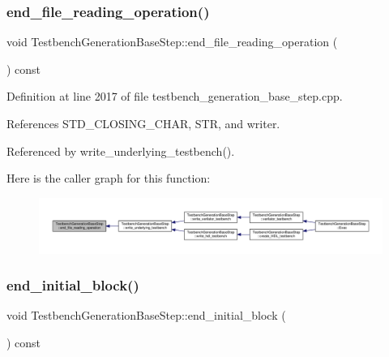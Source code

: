 \subsubsection{\texorpdfstring{end\+\_\+file\+\_\+reading\+\_\+operation()}{end\_file\_reading\_operation()}}
{\footnotesize\ttfamily void Testbench\+Generation\+Base\+Step\+::end\+\_\+file\+\_\+reading\+\_\+operation (\begin{DoxyParamCaption}{ }\end{DoxyParamCaption}) const\hspace{0.3cm}{\ttfamily [protected]}}



Definition at line 2017 of file testbench\+\_\+generation\+\_\+base\+\_\+step.\+cpp.



References S\+T\+D\+\_\+\+C\+L\+O\+S\+I\+N\+G\+\_\+\+C\+H\+AR, S\+TR, and writer.



Referenced by write\+\_\+underlying\+\_\+testbench().

Here is the caller graph for this function\+:
\nopagebreak
\begin{figure}[H]
\begin{center}
\leavevmode
\includegraphics[width=350pt]{dc/d02/classTestbenchGenerationBaseStep_ae3c011333a26f77252e27244cd7f08a9_icgraph}
\end{center}
\end{figure}
\mbox{\label{classTestbenchGenerationBaseStep_a3e753eed3a77b2340fb97e257f2ba820}} 
\subsubsection{\texorpdfstring{end\+\_\+initial\+\_\+block()}{end\_initial\_block()}}
{\footnotesize\ttfamily void Testbench\+Generation\+Base\+Step\+::end\+\_\+initial\+\_\+block (\begin{DoxyParamCaption}{ }\end{DoxyParamCaption}) const\hspace{0.3cm}{\ttfamily [protected]}}



